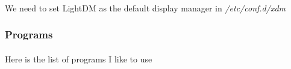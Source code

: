 \documentclass[10pt,a4paper]{article}
\begin{document}
                    \paragraph{} We need to set LightDM as the default display manager in \textit{/etc/conf.d/xdm}

                    

                \newpage
                \subsubsection{Programs}

                    \paragraph{} Here is the list of programs I like to use
\end{document}
